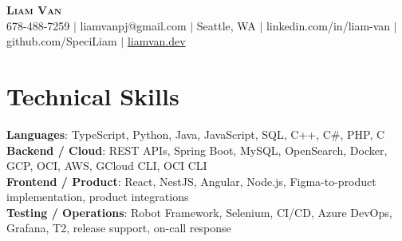 \documentclass[letterpaper,11pt]{article}
\begin{document}

%
\begin{center}
    \textbf{\Huge \scshape Liam Van} \\ \vspace{1pt}
    \small 678-488-7259 $|$ liamvanpj@gmail.com $|$ Seattle, WA $|$
    linkedin.com/in/liam-van $|$ github.com/SpeciLiam $|$ \href{https://liamvan.dev}{liamvan.dev}

\end{center}

\section{Technical Skills}
 \begin{itemize}[leftmargin=0.15in, label={}]
    \small{\item{
     \textbf{Languages}{: TypeScript, Python, Java, JavaScript, SQL, C++, C\#, PHP, C} \\
     \textbf{Backend / Cloud}{: REST APIs, Spring Boot, MySQL, OpenSearch, Docker, GCP, OCI, AWS, GCloud CLI, OCI CLI} \\
     \textbf{Frontend / Product}{: React, NestJS, Angular, Node.js, Figma-to-product implementation, product integrations} \\
     \textbf{Testing / Operations}{: Robot Framework, Selenium, CI/CD, Azure DevOps, Grafana, T2, release support, on-call response} \\
    }}
 \end{itemize}
%

\end{document}
